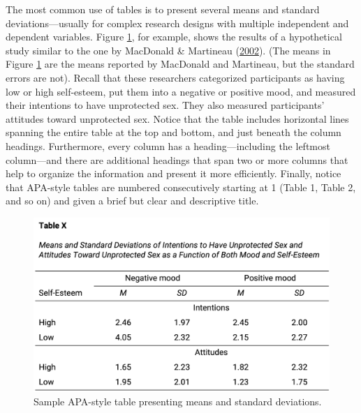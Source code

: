 \documentclass[
]{krantz}
\begin{document}
The most common use of tables is to present several means and standard deviations---usually for complex research designs with multiple independent and dependent variables. Figure \ref{fig:apatable}, for example, shows the results of a hypothetical study similar to the one by MacDonald \& Martineau (\protect\hyperlink{ref-macdonald2002self}{2002}). (The means in Figure \ref{fig:apatable} are the means reported by MacDonald and Martineau, but the standard errors are not). Recall that these researchers categorized participants as having low or high self-esteem, put them into a negative or positive mood, and measured their intentions to have unprotected sex. They also measured participants' attitudes toward unprotected sex. Notice that the table includes horizontal lines spanning the entire table at the top and bottom, and just beneath the column headings. Furthermore, every column has a heading---including the leftmost column---and there are additional headings that span two or more columns that help to organize the information and present it more efficiently. Finally, notice that APA-style tables are numbered consecutively starting at 1 (Table 1, Table 2, and so on) and given a brief but clear and descriptive title.

\begin{figure}

{\centering \includegraphics[width=0.65\linewidth]{images/ch12/apatable} 

}

\caption{Sample APA-style table presenting means and standard deviations.}\label{fig:apatable}
\end{figure}
\end{document}
